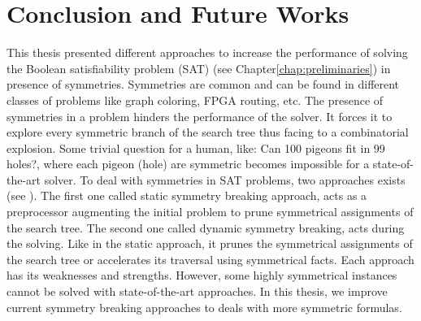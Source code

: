 ﻿\chapter{Conclusion and Future Works}\label{chap:conclu}

This thesis presented different approaches to increase the performance of solving 
the Boolean satisfiability problem (SAT) (see Chapter\ref{chap:preliminaries}) in presence of symmetries. 
Symmetries are common and  can be found in different classes of problems like
graph coloring, FPGA routing, etc.
The presence of symmetries in a problem hinders the performance of the solver. It forces
it to explore every symmetric branch of the search tree thus facing to a combinatorial explosion.
Some trivial question for a human, like: Can 100 pigeons fit in 99 holes?,
where each pigeon (hole) are symmetric becomes impossible for a state-of-the-art solver. 
To deal with symmetries in SAT problems, two approaches exists (see ).
The first one called static symmetry breaking approach, acts as a preprocessor augmenting the initial
problem to prune symmetrical assignments of the search tree. The second one called dynamic symmetry breaking,
acts during the solving. Like in the static approach, it prunes the symmetrical assignments of the 
search tree or accelerates its traversal using symmetrical facts.
Each approach has its weaknesses and strengths. However, some highly symmetrical instances cannot be solved with
state-of-the-art approaches. In this thesis, we improve current symmetry breaking approaches to 
deals with more symmetric formulas.

